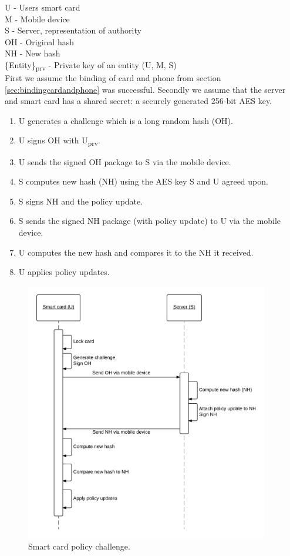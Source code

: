 U - Users smart card \\
M - Mobile device \\
S - Server, representation of authority \\
OH - Original hash \\
NH - New hash \\
\{Entity\}\textsubscript{prv} - Private key of an entity (U, M, S)\\

First we assume the binding of card and phone from section \ref{sec:bindingcardandphone} was successful. Secondly we assume that the server and smart card has a shared secret: a securely generated 256-bit AES key.

\begin{enumerate}
    \item U generates a challenge which is a long random hash (OH).
    \item U signs OH with U\textsubscript{prv}.
    \item U sends the signed OH package to S via the mobile device.
    \item S computes new hash (NH) using the AES key S and U agreed upon.
    \item S signs NH and the policy update.
    \item S sends the signed NH package (with policy update) to U via the mobile device.
    \item U computes the new hash and compares it to the NH it received.
    \item U applies policy updates.
\end{enumerate}

\begin{figure}[h!]
  \caption{Smart card policy challenge.}
  \label{fig:SQD_policy}
  \centering
    \includegraphics[width=0.95\textwidth]{images/SQD_Policy_Exchange.png}
\end{figure}

